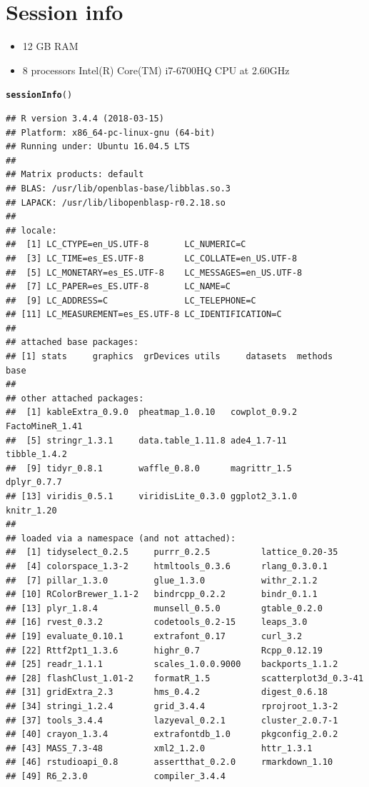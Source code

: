 \documentclass{article}\usepackage[]{graphicx}\usepackage[]{color}
\makeatletter
\newcommand{\hlstd}[1]{\textcolor[rgb]{0.345,0.345,0.345}{#1}}%
\newcommand{\hlkwd}[1]{\textcolor[rgb]{0.737,0.353,0.396}{\textbf{#1}}}%
\newenvironment{kframe}{%
 \def\at@end@of@kframe{}%
 \ifinner\ifhmode%
  \def\at@end@of@kframe{\end{minipage}}%
  \begin{minipage}{\columnwidth}%
 \fi\fi%
 \def\FrameCommand##1{\hskip\@totalleftmargin \hskip-\fboxsep
 \colorbox{shadecolor}{##1}\hskip-\fboxsep
     \hskip-\linewidth \hskip-\@totalleftmargin \hskip\columnwidth}%
 \MakeFramed {\advance\hsize-\width
   \@totalleftmargin\z@ \linewidth\hsize
   \@setminipage}}%
 {\par\unskip\endMakeFramed%
 \at@end@of@kframe}
\newenvironment{knitrout}{}{} %
\makeatother
\begin{document}
\section{Session info}
\begin{itemize}
\item 12 GB RAM
\item 8 processors Intel(R) Core(TM) i7-6700HQ CPU at 2.60GHz
\end{itemize}

\begin{knitrout}
\color{fgcolor}\begin{kframe}
\begin{alltt}
\hlkwd{sessionInfo}\hlstd{()}
\end{alltt}
\begin{verbatim}
## R version 3.4.4 (2018-03-15)
## Platform: x86_64-pc-linux-gnu (64-bit)
## Running under: Ubuntu 16.04.5 LTS
## 
## Matrix products: default
## BLAS: /usr/lib/openblas-base/libblas.so.3
## LAPACK: /usr/lib/libopenblasp-r0.2.18.so
## 
## locale:
##  [1] LC_CTYPE=en_US.UTF-8       LC_NUMERIC=C              
##  [3] LC_TIME=es_ES.UTF-8        LC_COLLATE=en_US.UTF-8    
##  [5] LC_MONETARY=es_ES.UTF-8    LC_MESSAGES=en_US.UTF-8   
##  [7] LC_PAPER=es_ES.UTF-8       LC_NAME=C                 
##  [9] LC_ADDRESS=C               LC_TELEPHONE=C            
## [11] LC_MEASUREMENT=es_ES.UTF-8 LC_IDENTIFICATION=C       
## 
## attached base packages:
## [1] stats     graphics  grDevices utils     datasets  methods   base     
## 
## other attached packages:
##  [1] kableExtra_0.9.0  pheatmap_1.0.10   cowplot_0.9.2     FactoMineR_1.41  
##  [5] stringr_1.3.1     data.table_1.11.8 ade4_1.7-11       tibble_1.4.2     
##  [9] tidyr_0.8.1       waffle_0.8.0      magrittr_1.5      dplyr_0.7.7      
## [13] viridis_0.5.1     viridisLite_0.3.0 ggplot2_3.1.0     knitr_1.20       
## 
## loaded via a namespace (and not attached):
##  [1] tidyselect_0.2.5     purrr_0.2.5          lattice_0.20-35     
##  [4] colorspace_1.3-2     htmltools_0.3.6      rlang_0.3.0.1       
##  [7] pillar_1.3.0         glue_1.3.0           withr_2.1.2         
## [10] RColorBrewer_1.1-2   bindrcpp_0.2.2       bindr_0.1.1         
## [13] plyr_1.8.4           munsell_0.5.0        gtable_0.2.0        
## [16] rvest_0.3.2          codetools_0.2-15     leaps_3.0           
## [19] evaluate_0.10.1      extrafont_0.17       curl_3.2            
## [22] Rttf2pt1_1.3.6       highr_0.7            Rcpp_0.12.19        
## [25] readr_1.1.1          scales_1.0.0.9000    backports_1.1.2     
## [28] flashClust_1.01-2    formatR_1.5          scatterplot3d_0.3-41
## [31] gridExtra_2.3        hms_0.4.2            digest_0.6.18       
## [34] stringi_1.2.4        grid_3.4.4           rprojroot_1.3-2     
## [37] tools_3.4.4          lazyeval_0.2.1       cluster_2.0.7-1     
## [40] crayon_1.3.4         extrafontdb_1.0      pkgconfig_2.0.2     
## [43] MASS_7.3-48          xml2_1.2.0           httr_1.3.1          
## [46] rstudioapi_0.8       assertthat_0.2.0     rmarkdown_1.10      
## [49] R6_2.3.0             compiler_3.4.4
\end{verbatim}
\end{kframe}
\end{knitrout}
\end{document}
